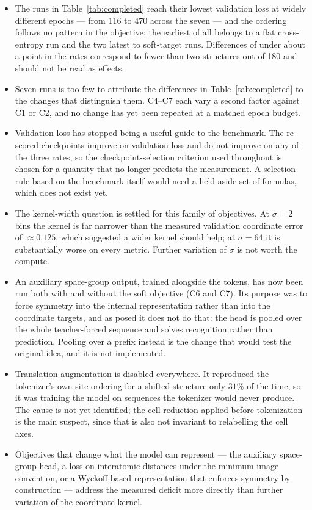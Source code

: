 \documentclass[manuscript,screen,review]{acmart}
\begin{document}
\begin{itemize}
  \item The runs in Table~\ref{tab:completed} reach their lowest validation
        loss at widely different epochs --- from 116 to 470 across the seven ---
        and the ordering follows no pattern in the objective: the earliest of
        all belongs to a flat cross-entropy run and the two latest to soft-target
        runs. Differences of under about a point in the rates correspond to fewer
        than two structures out of 180 and should not be read as effects.
  \item Seven runs is too few to attribute the differences in
        Table~\ref{tab:completed} to the changes that distinguish them. C4--C7
        each vary a second factor against C1 or C2, and no change has yet been
        repeated at a matched epoch budget.
  \item Validation loss has stopped being a useful guide to the benchmark. The
        re-scored checkpoints improve on validation loss and do not improve on
        any of the three rates, so the checkpoint-selection criterion used
        throughout is chosen for a quantity that no longer predicts the
        measurement. A selection rule based on the benchmark itself would need a
        held-aside set of formulas, which does not exist yet.
  \item The kernel-width question is settled for this family of objectives.
        At $\sigma = 2$ bins the kernel is far narrower than the measured
        validation coordinate error of $\approx 0.125$, which suggested a wider
        kernel should help; at $\sigma = 64$ it is substantially worse on every
        metric. Further variation of $\sigma$ is not worth the compute.
  \item An auxiliary space-group output, trained alongside the tokens, has now
        been run both with and without the soft objective (C6 and C7). Its
        purpose was to force symmetry into the internal representation rather
        than into the coordinate targets, and as posed it does not do that: the
        head is pooled over the whole teacher-forced sequence and solves
        recognition rather than prediction. Pooling over a prefix instead is the
        change that would test the original idea, and it is not implemented.
  \item Translation augmentation is disabled everywhere. It reproduced the
        tokenizer's own site ordering for a shifted structure only $31\%$ of
        the time, so it was training the model on sequences the tokenizer would
        never produce. The cause is not yet identified; the cell reduction
        applied before tokenization is the main suspect, since that is also not
        invariant to relabelling the cell axes.
  \item Objectives that change what the model can represent --- the auxiliary
        space-group head, a loss on interatomic distances under the
        minimum-image convention, or a Wyckoff-based representation that
        enforces symmetry by construction --- address the measured deficit more
        directly than further variation of the coordinate kernel.
\end{itemize}
\end{document}
